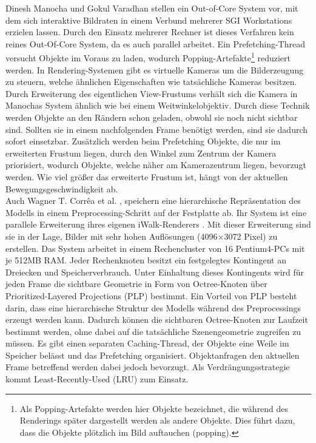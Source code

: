 Dinesh Manocha und Gokul Varadhan \cite{manocha} stellen ein Out-of-Core System vor, mit dem sich interaktive Bildraten in einem Verbund mehrerer SGI Workstations erzielen lassen. Durch den Einsatz mehrerer Rechner ist dieses Verfahren kein reines Out-Of-Core System, da es auch parallel arbeitet. Ein Prefetching-Thread versucht Objekte im Voraus zu laden, wodurch Popping-Artefakte\footnote{Als Popping-Artefakte werden hier Objekte bezeichnet, die während des Renderings später dargestellt werden als andere Objekte. Dies führt dazu, dass die Objekte plötzlich im Bild auftauchen (popping).} reduziert werden. In Rendering-Systemen gibt es virtuelle Kameras um die Bilderzeugung zu steuern,  welche ähnlichen Eigenschaften wie tatsächliche Kameras besitzen. Durch Erweiterung des eigentlichen View-Frustums verhält sich die Kamera in Manochas System ähnlich wie bei einem Weitwinkelobjektiv. Durch diese Technik werden Objekte an den Rändern schon geladen, obwohl sie noch nicht sichtbar sind. Sollten sie in einem nachfolgenden Frame benötigt werden, sind sie dadurch sofort einsetzbar. Zusätzlich werden beim Prefetching Objekte, die nur im erweiterten Frustum liegen, durch den Winkel zum Zentrum der Kamera priorisiert, wodurch Objekte, welche näher am Kamerazentrum liegen, bevorzugt werden. Wie viel größer das erweiterte Frustum ist, hängt von der aktuellen Bewegungsgeschwindigkeit ab.\\
Auch Wagner T. Corr\^{e}a et al. \cite{wagner1}, \cite{wagner2} speichern eine hierarchische Repräsentation des Modells in einem Preprocessing-Schritt auf der Festplatte ab. Ihr System ist eine parallele Erweiterung ihres eigenen iWalk-Renderers \cite{iwalk}. Mit dieser Erweiterung sind sie in der Lage, Bilder mit sehr hohen Auflösungen (4096$\times$3072 Pixel) zu erstellen. Das System arbeitet in einem Rechencluster von 16 Pentium4-PCs mit je 512MB RAM. Jeder Rechenknoten besitzt ein festgelegtes Kontingent an Dreiecken und Speicherverbrauch. Unter Einhaltung dieses Kontingents wird für jeden Frame die sichtbare Geometrie in Form von Octree-Knoten über Prioritized-Layered Projections (PLP) \cite{plp} bestimmt. Ein Vorteil von PLP besteht darin, dass eine hierarchische Struktur des Modells während des Preprocessings erzeugt werden kann. Dadurch können die sichtbaren Octree-Knoten zur Laufzeit bestimmt werden, ohne dabei auf die tatsächliche Szenengeometrie zugreifen zu müssen. Es gibt einen separaten Caching-Thread, der Objekte eine Weile im Speicher belässt und das Prefetching organisiert. Objektanfragen den aktuellen Frame betreffend werden dabei jedoch bevorzugt. Als Verdrängungsstrategie kommt Least-Recently-Used (LRU) zum Einsatz.\\

